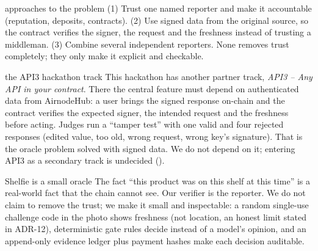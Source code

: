 \begin{center}
\end{center}

\begin{conceptbox}{approaches to the problem}
(1) Trust one named reporter and make it accountable (reputation, deposits, contracts). (2) Use signed data from the original source, so the contract verifies the signer, the request and the freshness instead of trusting a middleman. (3) Combine several independent reporters. None removes trust completely; they only make it explicit and checkable.
\end{conceptbox}

\begin{examplebox}{the API3 hackathon track}
This hackathon has another partner track, \emph{API3 -- Any API in your contract}. There the central feature must depend on authenticated data from AirnodeHub: a user brings the signed response on-chain and the contract verifies the expected signer, the intended request and the freshness before acting. Judges run a ``tamper test'' with one valid and four rejected responses (edited value, too old, wrong request, wrong key's signature). That is the oracle problem solved with signed data. We do not depend on it; entering API3 as a secondary track is undecided ().
\end{examplebox}

\begin{shelfiebox}{Shelfie is a small oracle}
The fact ``this product was on this shelf at this time'' is a real-world fact that the chain cannot see. Our verifier is the reporter. We do not claim to remove the trust; we make it small and inspectable: a random single-use challenge code in the photo shows freshness (not location, an honest limit stated in ADR-12), deterministic gate rules decide instead of a model's opinion, and an append-only evidence ledger plus payment hashes make each decision auditable.
\end{shelfiebox}

